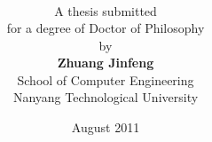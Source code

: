 

\title{\sc
\vspace{-1 in}\centering
{}\\[1em]
\vspace{0.1in} {~}\\[1em]
\vspace{0.2in}{\huge\bf Kernel Learning: Methods and Applications}\\[1em]}





\author{
A thesis submitted \\
for a degree of Doctor of Philosophy\\
by\\[1em]
{\rm\bf Zhuang Jinfeng}\\[1.5em]
School of Computer Engineering\\
Nanyang Technological University\\[1.5em]
}

\date{August 2011}
\maketitle
\thispagestyle{empty}        %

%
%
